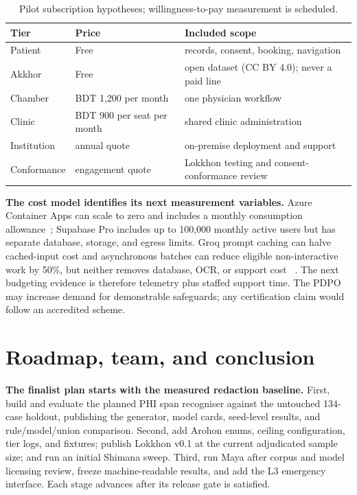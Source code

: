 \documentclass[12pt,twocolumn,a4paper]{article}
\begin{document}
\begin{table}[!t]
\caption{Pilot subscription hypotheses; willingness-to-pay measurement is scheduled.}
\label{tab:revenue}
\centering
\footnotesize
\setlength{\tabcolsep}{2.5pt}
\begin{tabularx}{\columnwidth}{@{}p{2.05cm}p{1.80cm}Y@{}}
\toprule
Tier & Price & Included scope \\
\midrule
Patient & Free & records, consent, booking, navigation \\
Akkhor & Free & open dataset (CC BY 4.0); never a paid line \\
Chamber & BDT 1,200 per month & one physician workflow \\
Clinic & BDT 900 per seat per month & shared clinic administration \\
Institution & annual quote & on-premise deployment and support \\
Conformance & engagement quote & Lokkhon testing and consent-conformance review \\
\bottomrule
\end{tabularx}
\end{table}

\textbf{The cost model identifies its next measurement variables.} Azure Container Apps can scale to zero
and includes a monthly consumption allowance~\cite{azurepricing}; Supabase Pro includes up to
100,000 monthly active users but has separate database, storage, and egress limits. Groq
prompt caching can halve cached-input cost and asynchronous batches can reduce eligible
non-interactive work by 50\%, but neither removes database, OCR, or support cost
~\cite{groq}. The next budgeting evidence is therefore telemetry plus staffed
support time. The PDPO may increase demand for demonstrable safeguards; any certification
claim would follow an accredited scheme.

\section{Roadmap, team, and conclusion}

\textbf{The finalist plan starts with the measured redaction baseline.} First, build and
evaluate the planned PHI span recogniser against the untouched 134-case holdout, publishing
the generator, model cards, seed-level results, and rule/model/union comparison. Second, add
Arohon enums, ceiling configuration, tier logs, and fixtures; publish Lokkhon v0.1 at the
current adjudicated sample size; and run an initial Shimana sweep. Third, run Maya after
corpus and model licensing review, freeze machine-readable results, and add the L3 emergency
interface. Each stage advances after its release gate is satisfied.
\end{document}
